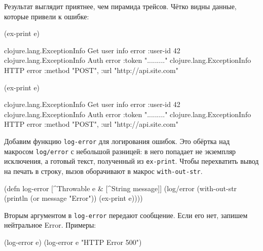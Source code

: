 \fi

Результат выглядит приятнее, чем пирамида трейсов. Чётко видны данные,
которые привели к ошибке:

\ifnarrow

\begin{english}
  \begin{clojure}
(ex-print e)

clojure.lang.ExceptionInfo
  Get user info error
  {:user-id 42}
clojure.lang.ExceptionInfo
  Auth error
  {:token "........."}
clojure.lang.ExceptionInfo
  HTTP error
  {:method "POST",
   :url "http://api.site.com"}
  \end{clojure}
\end{english}

\else

\begin{english}
  \begin{clojure}
(ex-print e)

clojure.lang.ExceptionInfo
  Get user info error
  {:user-id 42}
clojure.lang.ExceptionInfo
  Auth error
  {:token "........."}
clojure.lang.ExceptionInfo
  HTTP error
  {:method "POST", :url "http://api.site.com"}
  \end{clojure}
\end{english}

\fi


Добавим функцию \verb|log-error| для логирования ошибок. Это обёртка над
макросом \verb|log/error| с небольшой разницей: в него попадает не экземпляр
исключения, а готовый текст, полученный из \verb|ex-print|. Чтобы перехватить
вывод на печать в строку, вызов оборачивают в макрос \verb|with-out-str|.

\pagebreakafive

\begin{english}
  \begin{clojure}
(defn log-error
  [^Throwable e & [^String message]]
  (log/error
   (with-out-str
     (println (or message "Error"))
     (ex-print e))))
  \end{clojure}
\end{english}

Вторым аргументом в \verb|log-error| передают сообщение. Если его нет, запишем
нейтральное Error. Примеры:

\begin{english}
  \begin{clojure}
(log-error e)
(log-error e "HTTP Error 500")
  \end{clojure}
\end{english}

